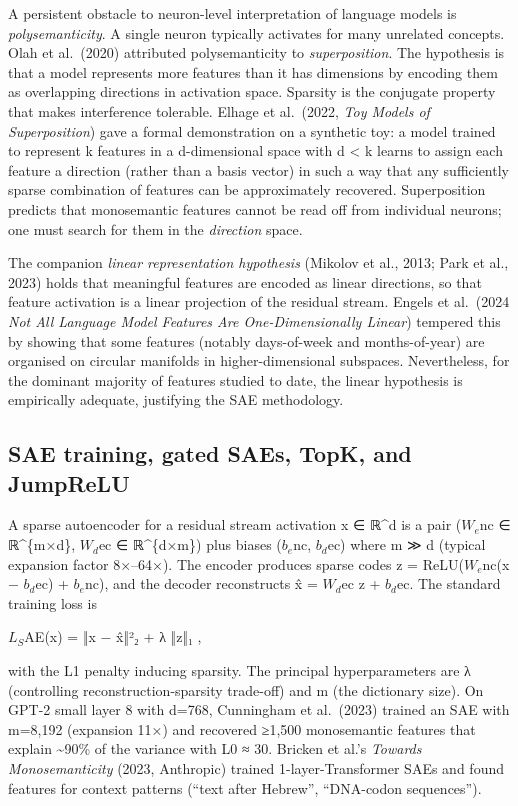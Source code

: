 A persistent obstacle to neuron-level interpretation of language models is \emph{polysemanticity}. A single neuron typically activates for many unrelated concepts. Olah et al.~(2020) attributed polysemanticity to \emph{superposition}. The hypothesis is that a model represents more features than it has dimensions by encoding them as overlapping directions in activation space. Sparsity is the conjugate property that makes interference tolerable. Elhage et al.~(2022, \emph{Toy Models of Superposition}) gave a formal demonstration on a synthetic toy: a model trained to represent k features in a d-dimensional space with d \textless{} k learns to assign each feature a direction (rather than a basis vector) in such a way that any sufficiently sparse combination of features can be approximately recovered. Superposition predicts that monosemantic features cannot be read off from individual neurons; one must search for them in the \emph{direction} space.

The companion \emph{linear representation hypothesis} (Mikolov et al., 2013; Park et al., 2023) holds that meaningful features are encoded as linear directions, so that feature activation is a linear projection of the residual stream. Engels et al.~(2024 \emph{Not All Language Model Features Are One-Dimensionally Linear}) tempered this by showing that some features (notably days-of-week and months-of-year) are organised on circular manifolds in higher-dimensional subspaces. Nevertheless, for the dominant majority of features studied to date, the linear hypothesis is empirically adequate, justifying the SAE methodology.

\subsection{SAE training, gated SAEs, TopK, and JumpReLU}\label{sae-training-gated-saes-topk-and-jumprelu}

A sparse autoencoder for a residual stream activation x ∈ ℝ\^{}d is a pair (\(W_e\)nc ∈ ℝ\^{}\{m×d\}, \(W_d\)ec ∈ ℝ\^{}\{d×m\}) plus biases (\(b_e\)nc, \(b_d\)ec) where m ≫ d (typical expansion factor 8×--64×). The encoder produces sparse codes z = ReLU(\(W_e\)nc(x − \(b_d\)ec) + \(b_e\)nc), and the decoder reconstructs x̂ = \(W_d\)ec z + \(b_d\)ec. The standard training loss is

\(L_S\)AE(x) = ‖x − x̂‖²₂ + λ ‖z‖₁ ,

with the L1 penalty inducing sparsity. The principal hyperparameters are λ (controlling reconstruction-sparsity trade-off) and m (the dictionary size). On GPT-2 small layer 8 with d=768, Cunningham et al.~(2023) trained an SAE with m=8,192 (expansion 11×) and recovered ≥1,500 monosemantic features that explain \textasciitilde90\% of the variance with L0 ≈ 30. Bricken et al.'s \emph{Towards Monosemanticity} (2023, Anthropic) trained 1-layer-Transformer SAEs and found features for context patterns (``text after Hebrew'', ``DNA-codon sequences'').

